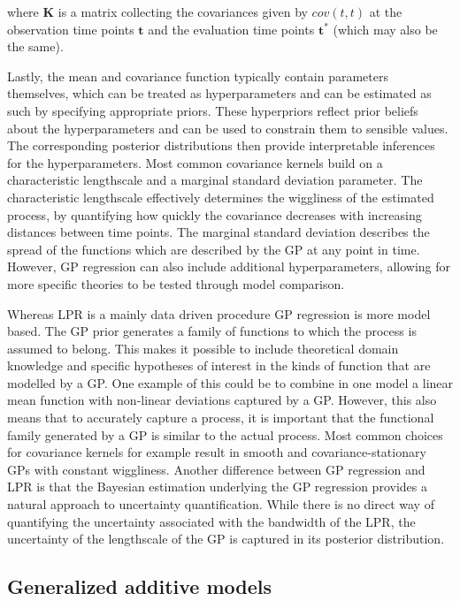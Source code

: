 \documentclass[man, floatsintext]{apa7}
\begin{document}
\noindent where $\textbf{K}$ is a matrix collecting the covariances given by
$cov(t, t)$ at the observation time points $\textbf{t}$ and the evaluation time
points $\textbf{t}^*$ (which may also be the same).

Lastly, the mean and covariance function typically contain parameters
themselves, which can be treated as hyperparameters and can be estimated as
such by specifying appropriate priors. These hyperpriors reflect prior beliefs
about the hyperparameters and can be used to constrain them to sensible values.
The corresponding posterior distributions then provide interpretable inferences
for the hyperparameters. Most common covariance kernels build on a
characteristic lengthscale and a marginal standard deviation parameter. The
characteristic lengthscale effectively determines the wiggliness of the
estimated process, by quantifying how quickly the covariance decreases with
increasing distances between time points. The marginal standard deviation
describes the spread of the functions which are described by the GP at any
point in time. However, GP regression can also include additional
hyperparameters, allowing for more specific theories to be tested through model
comparison.

Whereas LPR is a mainly data driven procedure GP regression is more model
based. The GP prior generates a family of functions to which the process is
assumed to belong. This makes it possible to include theoretical domain
knowledge and specific hypotheses of interest in the kinds of function that are
modelled by a GP\@. One example of this could be to combine in one model a
linear mean function with non-linear deviations captured by a GP\@. However,
this also means that to accurately capture a process, it is important that the
functional family generated by a GP is similar to the actual process. Most
common choices for covariance kernels for example result in smooth and
covariance-stationary GPs with constant wiggliness. Another difference between
GP regression and LPR is that the Bayesian estimation underlying the GP
regression provides a natural approach to uncertainty quantification. While
there is no direct way of quantifying the uncertainty associated with the
bandwidth of the LPR, the uncertainty of the lengthscale of the GP is captured
in its posterior distribution.

\subsection{Generalized additive models}
\end{document}

